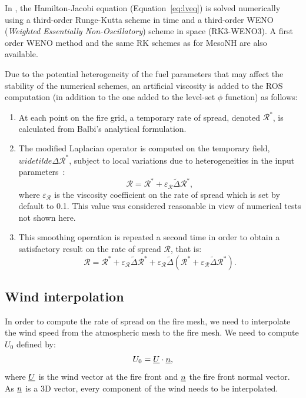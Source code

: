 \medskip

In \Blaze, the Hamilton-Jacobi equation (Equation~\ref{eq:lveq}) is solved numerically using a third-order Runge-Kutta scheme in time and a third-order WENO (\emph{Weighted Essentially Non-Oscillatory}) scheme in space (RK3-WENO3). A first order WENO method and the same RK schemes as for MesoNH are also available.

\medskip

Due to the potential heterogeneity of the fuel parameters that may affect the stability of the numerical schemes, an artificial viscosity is added to the ROS computation (in addition to the one added to the level-set $\phi$ function) as follows:
\begin{enumerate}
	\item At each point on the fire grid, a temporary rate of spread, denoted $\mathcal R^*$, is calculated from Balbi's analytical formulation.
	\item The modified Laplacian operator is computed on the temporary field, $widetilde \Delta \mathcal R^*$, subject to local variations due to heterogeneities in the input parameters~:
\begin{equation}
\mathcal R = \mathcal R^* + \varepsilon_{\mathcal R} \widetilde \Delta \mathcal R^*,
\end{equation}
where $\varepsilon_{\mathcal R}$ is the viscosity coefficient on the rate of spread which is set by default to 0.1. This value was considered reasonable in view of numerical tests not shown here.
	\item This smoothing operation is repeated a second time in order to obtain a satisfactory result on the rate of spread $\mathcal R$, that is:
\begin{equation}
  \mathcal R = \mathcal R^* + \varepsilon_{\mathcal R} \widetilde \Delta \mathcal R^* + \varepsilon_{\mathcal R}  \widetilde \Delta \left ( \mathcal R^* + \varepsilon_{\mathcal R} \widetilde \Delta \mathcal R^* \right ).
\end{equation}
\end{enumerate}

\subsection{Wind interpolation}

In order to compute the rate of spread on the fire mesh, we need to interpolate the wind speed from the atmospheric mesh to the fire mesh. We need to compute $U_0$ defined by:
\begin{equation}
  U_0 = \underline{U} \cdot \underline{n},
\end{equation}
where $\underline{U}$ is the wind vector at the fire front and $\underline{n}$ the fire front normal vector. As $\underline{n}$ is a 3D vector, every component of the wind needs to be interpolated.


